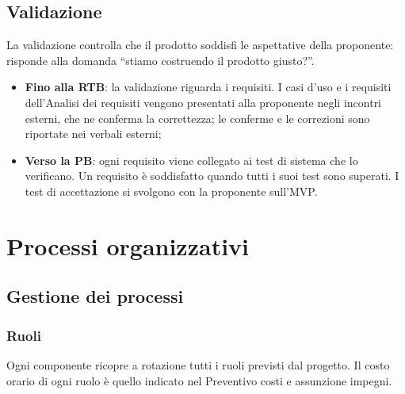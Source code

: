 \documentclass[12pt,a4paper]{article}
\newcommand{\tightlist}{\setlength{\itemsep}{1pt}\setlength{\parskip}{0pt}}
\begin{document}
\subsection{Validazione}\label{sec:validazione}
La validazione controlla che il prodotto soddisfi le aspettative della proponente: risponde alla domanda ``stiamo costruendo il prodotto giusto?''.

\begin{itemize}
\tightlist
\item \textbf{Fino alla RTB}: la validazione riguarda i requisiti. I casi d'uso e i requisiti dell'Analisi dei requisiti vengono presentati alla proponente negli incontri esterni, che ne conferma la correttezza; le conferme e le correzioni sono riportate nei verbali esterni;
\item \textbf{Verso la PB}: ogni requisito viene collegato ai test di sistema che lo verificano. Un requisito è soddisfatto quando tutti i suoi test sono superati. I test di accettazione si svolgono con la proponente sull'MVP.
\end{itemize}

\section{Processi organizzativi}\label{sec:organizzativi}

\subsection{Gestione dei processi}

\subsubsection{Ruoli}
Ogni componente ricopre a rotazione tutti i ruoli previsti dal progetto. Il costo orario di ogni ruolo è quello indicato nel Preventivo costi e assunzione impegni.
\end{document}
